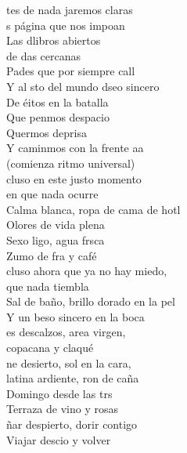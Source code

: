 \begin{cancion}[Copacabana][Izal]%
	tes de nada jaremos claras\\
	s página que nos impoan\\
	Las dlibros abiertos \\
	de das cercanas\\
	Pades que por siempre call\\
	Y al sto del mundo dseo sincero\\
	De éitos en la batalla \\
	Que penmos despacio\\
	Quermos deprisa\\
	Y caminmos con la frente aa\\
(comienza ritmo universal)\\
\jump
	cluso en este justo momento \\
en que nada ocurre\\
	Calma blanca, ropa de cama de hotl\\
Olores de vida plena\\
	Sexo ligo, agua frsca\\
	Zumo de fra y café\\
\jump
	cluso ahora que ya no hay miedo, \\
que nada tiembla\\
	Sal de baño, brillo dorado en la pel\\
Y un beso sincero en la boca\\
	es descalzos, area virgen, \\
	copacana y claqué\\
\jump
	ne desierto, sol en la cara, \\
latina ardiente, ron de caña\\
	Domingo desde las trs\\
Terraza de vino y rosas\\
	ñar despierto, dorir contigo\\
	Viajar descio y volver\\\jump\\
	\begin{chorus}%

\end{chorus}
\end{cancion}
